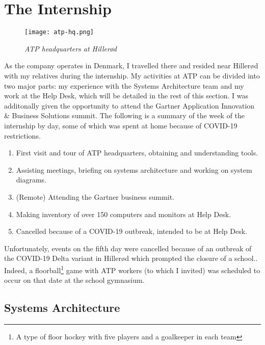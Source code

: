 \section{The Internship}

\begin{figure}[H]
    \centering
        \texttt{[image: atp-hq.png]}
        \caption*{\textit{ATP headquarters at Hillerød\cite{about_atp}}}
\end{figure}

As the company operates in Denmark, I travelled there and resided near Hillerød with my relatives during the internship. My activities at ATP can be divided into two major parts: my experience with the Systems Architecture team and my work at the Help Desk, which will be detailed in the rest of this section. I was additonally given the opportunity to attend the Gartner Application Innovation \& Business Solutions summit. The following is a summary of the week of the internship by day, some of which was spent at home because of COVID-19 restrictions.

\begin{enumerate}
    \item First visit and tour of ATP headquarters, obtaining and understanding tools.
    \item Assisting meetings, briefing on systems architecture and working on system diagrams.
    \item (Remote) Attending the Gartner business summit.
    \item Making inventory of over 150 computers and monitors at Help Desk.
    \item Cancelled because of a COVID-19 outbreak, intended to be at Help Desk.
\end{enumerate}

Unfortunately, events on the fifth day were cancelled because of an outbreak of the COVID-19 Delta variant in Hillerød which prompted the closure of a school.\cite{covid_rip}. Indeed, a floorball\footnote[0]{A type of floor hockey with five players and a goalkeeper in each team} game with ATP workers (to which I invited) was scheduled to occur on that date at the school gymnasium.

\newpage    %

\subsection{Systems Architecture}

